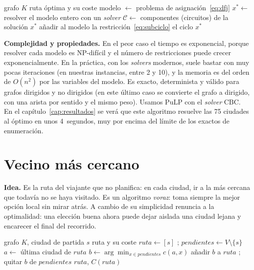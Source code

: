 \begin{algorithm}[htbp]
  \caption{DFJ con eliminación iterativa de subciclos}\label{alg:dfj}
  \begin{algorithmic}[1]
    \Require grafo $K$
    \Ensure ruta óptima y su coste
    \State modelo $\gets$ problema de asignación~\eqref{eq:dfj}
    \Repeat
      \State $x^{*} \gets$ resolver el modelo entero con un \emph{solver}
      \State $\mathcal{C} \gets$ componentes (circuitos) de la solución $x^{*}$
         \State añadir al modelo la restricción~\eqref{eq:subciclo} \EndFor
      \EndIf
    \State \Return el ciclo $x^{*}$
  \end{algorithmic}
\end{algorithm}

\textbf{Complejidad y propiedades.} En el peor caso el tiempo es exponencial, porque resolver cada modelo es NP-difícil y el número de restricciones puede crecer exponencialmente. En la práctica, con los \emph{solvers} modernos, suele bastar con muy pocas iteraciones
(en nuestras instancias, entre 2 y 10), y la memoria es del orden de $O(n^2)$ por las variables del modelo. Es exacto, determinista y válido para grafos dirigidos y no dirigidos (en este último caso se convierte el grafo a dirigido, con una arista por sentido y el mismo peso).
Usamos PuLP con el \emph{solver} CBC. En el capítulo~\ref{cap:resultados} se verá que este algoritmo resuelve las 75 ciudades al óptimo en unos 4~segundos, muy por encima del límite de los exactos de enumeración.

\section{Vecino más cercano}\label{sec:vecino}

\textbf{Idea.} Es la ruta del viajante que no planifica: en cada ciudad, ir a la más cercana que todavía no se haya visitado. Es un algoritmo \emph{voraz}: toma siempre la mejor opción local sin mirar atrás. A cambio de su simplicidad renuncia a la optimalidad: una elección buena ahora
puede dejar aislada una ciudad lejana y encarecer el final del recorrido.

\begin{algorithm}[htbp]
  \caption{Vecino más cercano}\label{alg:nn}
  \begin{algorithmic}[1]
    \Require grafo $K$, ciudad de partida $s$
    \Ensure ruta y su coste
    \State $ruta \gets [s]$ \;;\; $pendientes \gets V\setminus\{s\}$
      \State $a \gets$ última ciudad de $ruta$
      \State $b \gets \arg\min_{x\in pendientes} c(a,x)$ 
      \State añadir $b$ a $ruta$ \;;\; quitar $b$ de $pendientes$
    \EndWhile
    \State \Return $ruta$, $C(ruta)$ 
  \end{algorithmic}
\end{algorithm}

